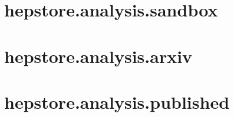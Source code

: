 
\section{hepstore.analysis.sandbox}

\section{hepstore.analysis.arxiv}

\section{hepstore.analysis.published}
